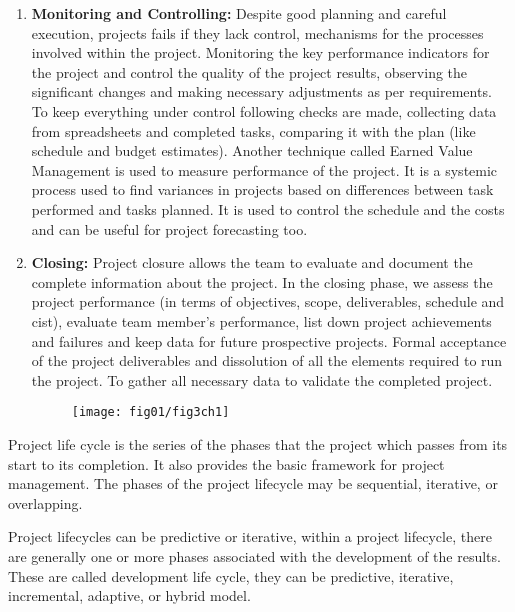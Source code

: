 \begin{enumerate}
    \item \textbf{Monitoring and Controlling:} Despite good planning and careful execution, projects fails if they lack control, mechanisms for the processes involved within the project. Monitoring the key performance indicators for the project and control the quality of the project results, observing the significant changes and making necessary adjustments as per requirements. To keep everything under control following checks are made, collecting data from spreadsheets and completed tasks, comparing it with the plan (like schedule and budget estimates). Another technique called Earned Value Management is used to measure performance of the project. It is a systemic process used to find variances in projects based on differences between task performed and tasks planned. It is used to control the schedule and the costs and can be useful for project forecasting too.

    \item \textbf{Closing:} Project closure allows the team to evaluate and document the complete information about the project. In the closing phase, we assess the project performance (in terms of objectives, scope, deliverables, schedule and cist), evaluate team member’s performance, list down project achievements and failures and keep data for future prospective projects. Formal acceptance of the project deliverables and dissolution of all the elements required to run the project. To gather all necessary data to validate the completed project. 
    
    \begin{figure}
    	\centering
    	\texttt{[image: fig01/fig3ch1]}
    \end{figure}
    

\end{enumerate}


Project life cycle is the series of the phases that the project which passes from its start to its completion. It also provides the basic framework for project management. The phases of the project lifecycle may be sequential, iterative, or overlapping.

Project lifecycles can be predictive or iterative, within a project lifecycle, there are generally one or more phases associated with the development of the results. These are called development life cycle, they can be predictive, iterative, incremental, adaptive, or hybrid model.

